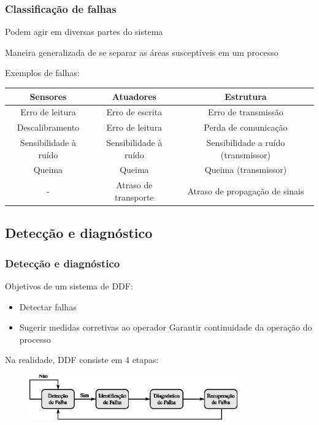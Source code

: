 \documentclass{beamer}
\begin{document}
\begin{frame}
    \frametitle{Classificação de falhas}

    Podem agir em diversas partes do sistema

    \vspace{0.25cm}

    Maneira generalizada de se separar as áreas susceptíveis em um processo

    \vspace{0.25cm}

    Exemplos de falhas:

\begin{table}[htb]
\scriptsize
\centering
\begin{tabular}{|c|c|c|}
\hline
{\bf Sensores} & {\bf Atuadores} & {\bf Estrutura}\\
\hline
\hline
Erro de leitura & Erro de escrita & Erro de transmissão\\
\hline
Descalibramento & Erro de leitura & Perda de comunicação\\
\hline
Sensibilidade à ruído & Sensibilidade à ruído & Sensibilidade a ruído
(transmissor)\\
\hline
Queima & Queima & Queima (transmissor)\\
\hline
- & Atraso de transporte & Atraso de propagação de sinais\\
\hline
\end{tabular}
\end{table}

\end{frame}

\subsection{Detecção e diagnóstico}
\begin{frame}
    \frametitle{Detecção e diagnóstico}

    Objetivos de um sistema de DDF:

\begin{itemize}
    \item Detectar falhas
    \item Sugerir medidas corretivas ao operador \implica Garantir continuidade
          da operação do processo
\end{itemize}

    Na realidade, DDF consiste em 4 etapas:

\begin{figure}[htb]
\centering
    \includegraphics[width=0.8\textwidth]
    {imgs/detec_diag/eps/fases_monitoramento}
\end{figure}
\end{frame}
\end{document}
